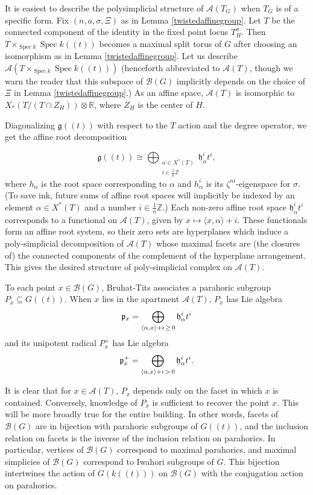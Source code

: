 \documentclass[12pt]{article}
\DeclareMathOperator{\Spec}{Spec}
\theoremstyle{remark}
\begin{document}
It is easiest to describe the polysimplicial structure of $\mathcal{A}(T_G)$ when $T_G$ is of a specific form. Fix $(n,a,\sigma,\Xi)$ as in Lemma \ref{twistedaffinegroup}. Let $T$ be the connected component of the identity in the fixed point locus $T_H^{\sigma}.$ Then $T\times_{\Spec k}\Spec k((t))$ becomes a maximal split torus of $G$ after choosing an isomorphism as in Lemma \ref{twistedaffinegroup}. Let us describe $\mathcal{A}(T\times_{\Spec k}\Spec k((t)))$ (henceforth abbreviated to $\mathcal{A}(T)$, though we warn the reader that this subspace of $\mathcal{B}(G)$ implicitly depends on the choice of $\Xi$ in Lemma \ref{twistedaffinegroup}.) As an affine space, $\mathcal{A}(T)$ is isomorphic to $X_*(T/(T\cap Z_H))\otimes\mathbb{R}$, where $Z_H$ is the center of $H$.

Diagonalizing $\mathfrak{g}((t))$ with respect to the $T$ action and the degree operator, we get the affine root decomposition

\[
\mathfrak{g}((t))\cong\displaystyle\bigoplus_{\substack{\alpha\in X^*(T)\\ i\in\frac{1}{n}\mathbb{Z}}}\mathfrak{h}_{\alpha}^it^i,
\]
where $h_{\alpha}$ is the root space corresponding to $\alpha$ and $h_{\alpha}^i$ is its $\zeta^{ni}$-eigenspace for $\sigma$. (To save ink, future sums of affine root spaces will implicitly be indexed by an element $\alpha\in X^*(T)$ and a number $i\in\frac{1}{n}\mathbb{Z}$.) Each non-zero affine root space $\mathfrak{h}_{\alpha}^it^i$ corresponds to a functional on $\mathcal{A}(T)$, given by $x\mapsto\langle x,\alpha\rangle+i.$ These functionals form an affine root system, so their zero sets are hyperplanes which induce a poly-simplicial decomposition of $\mathcal{A}(T)$ whose maximal facets are (the closures of) the connected components of the complement of the hyperplane arrangement. This gives the desired structure of poly-simplicial complex on $\mathcal{A}(T)$.

To each point $x\in\mathcal{B}(G)$, Bruhat-Tits associates a parahoric subgroup $P_x\subseteq G((t))$. When $x$ lies in the apartment $\mathcal{A}(T)$, $P_x$ has Lie algebra
\[
\mathfrak{p}_{x}=\displaystyle\bigoplus_{\langle\alpha,x\rangle+i\thinspace\geq\thinspace 0}\mathfrak{h}_{\alpha}^it^i
\]
and its unipotent radical $P_x^+$ has Lie algebra
\[
\mathfrak{p}_x^+=\displaystyle\bigoplus_{\langle\alpha,x\rangle+i\thinspace>\thinspace 0}\mathfrak{h}_{\alpha}^it^i.
\]

It is clear that for $x\in\mathcal{A}(T)$, $P_x$ depends only on the facet in which $x$ is contained. Conversely, knowledge of $P_x$ is sufficient to recover the point $x$. This will be more broadly true for the entire building. In other words, facets of $\mathcal{B}(G)$ are in bijection with parahoric subgroups of $G((t))$, and the inclusion relation on facets is the inverse of the inclusion relation on parahorics. In particular, vertices of $\mathcal{B}(G)$ correspond to maximal parahorics, and maximal simplicies of $\mathcal{B}(G)$ correspond to Iwahori subgroups of $G$. This bijection intertwines the action of $G(k((t)))$ on $\mathcal{B}(G)$ with the conjugation action on parahorics.
\end{document}
